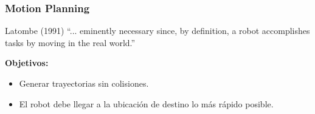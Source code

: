 \begin{frame}
	\frametitle{Motion Planning}
	
	\begin{block}{Latombe (1991)}
		``... eminently necessary since, by definition, a robot accomplishes tasks by moving in the real world.''
	\end{block}
	
	\textbf{Objetivos:}
	\begin{itemize}
		\item Generar trayectorias sin colisiones.
		\item El robot debe llegar a la ubicación de destino lo más rápido posible.
	\end{itemize}
\end{frame}

